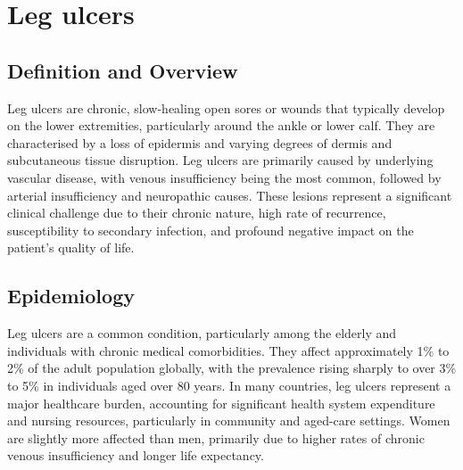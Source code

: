 \chapter{Leg ulcers}

\section*{Definition and Overview}
Leg ulcers are chronic, slow-healing open sores or wounds that typically develop on the lower extremities, particularly around the ankle or lower calf. They are characterised by a loss of epidermis and varying degrees of dermis and subcutaneous tissue disruption. Leg ulcers are primarily caused by underlying vascular disease, with venous insufficiency being the most common, followed by arterial insufficiency and neuropathic causes. These lesions represent a significant clinical challenge due to their chronic nature, high rate of recurrence, susceptibility to secondary infection, and profound negative impact on the patient's quality of life.

\section*{Epidemiology}
Leg ulcers are a common condition, particularly among the elderly and individuals with chronic medical comorbidities. They affect approximately 1\% to 2\% of the adult population globally, with the prevalence rising sharply to over 3\% to 5\% in individuals aged over 80 years. In many countries, leg ulcers represent a major healthcare burden, accounting for significant health system expenditure and nursing resources, particularly in community and aged-care settings. Women are slightly more affected than men, primarily due to higher rates of chronic venous insufficiency and longer life expectancy.


